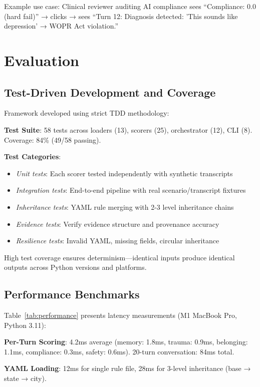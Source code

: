\documentclass{article}%
\begin{document}
Example use case: Clinical reviewer auditing AI compliance sees ``Compliance: 0.0 (hard fail)'' → clicks → sees ``Turn 12: Diagnosis detected: 'This sounds like depression' → WOPR Act violation.''

%
\section{Evaluation}%
\label{sec:Evaluation}%
%
\subsection{Test{-}Driven Development and Coverage}%
\label{subsec:Test{-}DrivenDevelopmentandCoverage}%
Framework developed using strict TDD methodology:\

\textbf{Test Suite}: 58 tests across loaders (13), scorers (25), orchestrator (12), CLI (8). Coverage: 84\% (49/58 passing).\

\textbf{Test Categories}:\
\begin{itemize}
    \item \textit{Unit tests}: Each scorer tested independently with synthetic transcripts
    \item \textit{Integration tests}: End-to-end pipeline with real scenario/transcript fixtures
    \item \textit{Inheritance tests}: YAML rule merging with 2-3 level inheritance chains
    \item \textit{Evidence tests}: Verify evidence structure and provenance accuracy
    \item \textit{Resilience tests}: Invalid YAML, missing fields, circular inheritance
\end{itemize}

High test coverage ensures determinism—identical inputs produce identical outputs across Python versions and platforms.

%
\subsection{Performance Benchmarks}%
\label{subsec:PerformanceBenchmarks}%
Table~\ref{tab:performance} presents latency measurements (M1 MacBook Pro, Python 3.11):\

\textbf{Per-Turn Scoring}: 4.2ms average (memory: 1.8ms, trauma: 0.9ms, belonging: 1.1ms, compliance: 0.3ms, safety: 0.6ms). 20-turn conversation: 84ms total.\

\textbf{YAML Loading}: 12ms for single rule file, 28ms for 3-level inheritance (base → state → city).\
\end{document}
